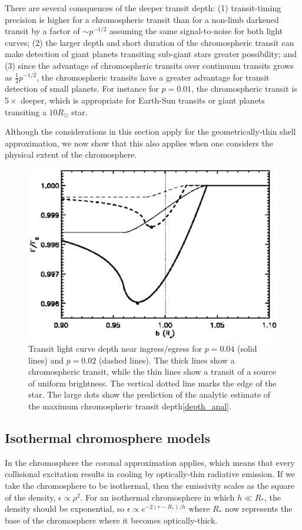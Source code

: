 \documentclass[twocolumn]{emulateapj}
\begin{document}
There are several consquences of the deeper transit depth:
(1) transit-timing precision is higher for a chromospheric
transit than for a non-limb darkened transit by a factor of
$\sim p^{-1/2}$ assuming the same signal-to-noise for
both light curves; (2) the larger depth and short duration
of the chromospheric transit can make detection of giant
planets transiting sub-giant stars greater possibility;
and (3) since the advantage of chromospheric transits
over continuum transits grows as $\frac{1}{2}p^{-1/2}$,
the chromospheric transits have a greater advantage for
transit detection of small planets. For instance
for $p=0.01$, the chromospheric transit is $5\times$
deeper, which is appropriate for Earth-Sun transits
or giant planets transiting a $10R_\odot$ star.

Although the considerations in this section apply
for the geometrically-thin shell approximation,
we now show that this also applies when one considers
the physical extent of the chromosphere.

\begin{figure}
\includegraphics[width=0.5 \textwidth]{comp_size.eps}
\caption{Transit light curve depth near ingress/egress 
for $p=0.04$ (solid lines) and $p=0.02$ (dashed lines).
The thick lines show a chromospheric transit, while the 
thin lines show a transit of a source of uniform brightness.
The vertical dotted line marks the edge of the star.
The large dots show the prediction of the analytic
estimate of the maximum chromospheric transit depth\ref{depth_anal}.}
\label{fig02}
\end{figure}

\subsection{Isothermal chromosphere models}

In the chromosphere the coronal approximation applies,
which means that every collisional excitation results
in cooling by optically-thin radiative emission.
If we take the chromosphere to be isothermal, then
the emissivity scales as the square of the density,
$\epsilon \propto \rho^2$.  For an isothermal chromosphere
in which $h \ll R_*$, the density should be exponential,
so $\epsilon \propto e^{-2 (r-R_*)/h}$ where $R_*$
now represents the base of the chromosphere where it
becomes optically-thick.
\end{document}
